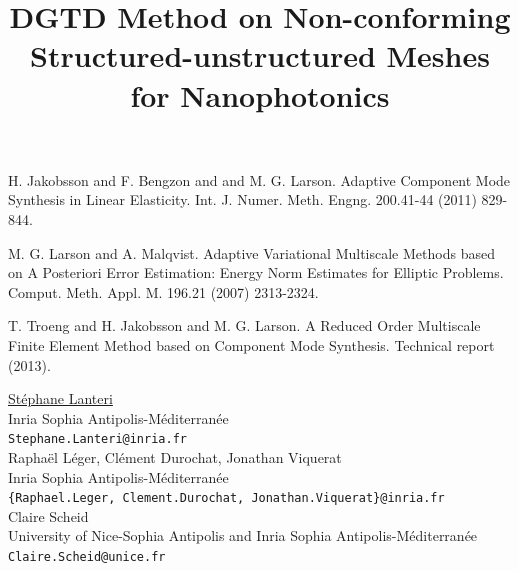 \documentclass[article, A4, 11pt]{llncs}%
\begin{document}

\begin{thebibliography}{10}
{\sc H. Jakobsson and F. Bengzon and and M. G. Larson}. {Adaptive Component Mode Synthesis in Linear Elasticity}. Int. J. Numer. Meth. Engng. 200.41-44 (2011) 829-844.

{\sc M. G. Larson and A. Malqvist}. {Adaptive Variational Multiscale Methods based on A Posteriori Error Estimation: Energy Norm Estimates for Elliptic Problems}. Comput. Meth. Appl. M. 196.21 (2007) 2313-2324.

{\sc T. Troeng and H. Jakobsson and M. G. Larson}. {A Reduced Order Multiscale Finite Element Method based on Component Mode Synthesis}. Technical report (2013).
\end{thebibliography} %

\title{DGTD  Method  on  Non-conforming  Structured-unstructured  Meshes  for Nanophotonics}
 \author{} \institute{}
\maketitle
\vspace*{-3mm}
\begin{center}
{\large \underline{Stéphane Lanteri}}\\
Inria Sophia Antipolis-Méditerranée\\
{\tt Stephane.Lanteri@inria.fr}
\\ \vspace{4mm}
{\large Raphaël Léger, Clément Durochat, Jonathan Viquerat}\\
Inria Sophia Antipolis-Méditerranée\\
{\tt \{Raphael.Leger, Clement.Durochat, Jonathan.Viquerat\}@inria.fr}
\\ \vspace{4mm}
{\large Claire Scheid}\\
University of Nice-Sophia Antipolis and Inria Sophia Antipolis-Méditerranée\\
{\tt Claire.Scheid@unice.fr}
\end{center}
\end{document}
